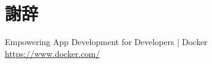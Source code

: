 \documentclass[a4paper,12pt]{ujreport}
\begin{document}
\chapter*{謝辞}



\begin{thebibliography}{99}%

  Empowering App Development for Developers | Docker\\
  \url{https://www.docker.com/}

\end{thebibliography}
\appendix
\end{document}

